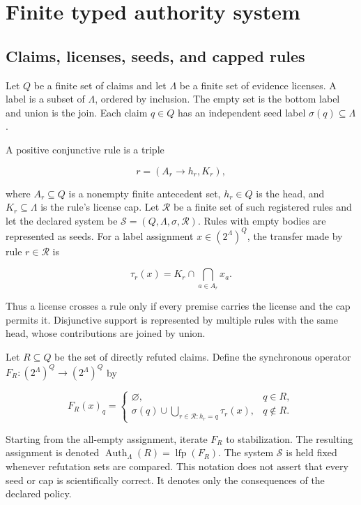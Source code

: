 \documentclass[pdflatex,sn-mathphys-num]{sn-jnl}
\begin{document}
\section{Finite typed authority system}\label{finite-typed-authority-system}

\subsection{Claims, licenses, seeds, and capped rules}\label{claims-licenses-seeds-and-capped-rules}

Let \(Q\) be a finite set of claims and let \(\Lambda\) be a finite set of evidence licenses. A label is a subset of \(\Lambda\), ordered by inclusion. The empty set is the bottom label and union is the join. Each claim \(q\in Q\) has an independent seed label \(\sigma(q)\subseteq\Lambda\).

A positive conjunctive rule is a triple

\[
r=(A_r\rightarrow h_r, K_r),
\]

where \(A_r\subseteq Q\) is a nonempty finite antecedent set, \(h_r\in Q\) is the head, and \(K_r\subseteq\Lambda\) is the rule's license cap. Let \(\mathcal{R}\) be a finite set of such registered rules and let the declared system be \(\mathcal{S}=(Q,\Lambda,\sigma,\mathcal{R})\). Rules with empty bodies are represented as seeds. For a label assignment \(x\in(2^\Lambda)^Q\), the transfer made by rule \(r\in\mathcal{R}\) is

\[
\tau_r(x)=K_r\cap\bigcap_{a\in A_r}x_a.
\]

Thus a license crosses a rule only if every premise carries the license and the cap permits it. Disjunctive support is represented by multiple rules with the same head, whose contributions are joined by union.

Let \(R\subseteq Q\) be the set of directly refuted claims. Define the synchronous operator \(F_R:(2^\Lambda)^Q\rightarrow(2^\Lambda)^Q\) by

\[
F_R(x)_q=
\begin{cases}
\varnothing, & q\in R,\\[3pt]
\displaystyle \sigma(q)\cup
\bigcup_{r\in\mathcal{R}:h_r=q}\tau_r(x), & q\notin R.
\end{cases}
\]

Starting from the all-empty assignment, iterate \(F_R\) to stabilization. The resulting assignment is denoted \(\operatorname{Auth}_\Lambda(R)=\operatorname{lfp}(F_R)\). The system \(\mathcal{S}\) is held fixed whenever refutation sets are compared. This notation does not assert that every seed or cap is scientifically correct. It denotes only the consequences of the declared policy.
\end{document}
